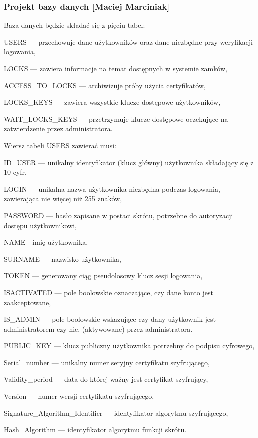 	\subsubsection{Projekt bazy danych [Maciej Marciniak]} 
	Baza danych będzie składać się z pięciu tabel:
	\begin{itemize*}
		\item {USERS} --- przechowuje dane użytkowników oraz dane niezbędne przy weryfikacji logowania,
		\item {LOCKS} --- zawiera informacje na temat dostępnych w systemie zamków,
		\item {ACCESS\_TO\_LOCKS} --- archiwizuje próby użycia certyfikatów,
		\item {LOCKS\_KEYS} --- zawiera wszystkie klucze dostępowe użytkowników,
		\item {WAIT\_LOCKS\_KEYS} --- przetrzymuje klucze dostępowe oczekujące na zatwierdzenie przez administratora.
	\end{itemize*}
	
	Wiersz tabeli USERS zawierać musi:
	\begin{itemize*}
		\item {ID\_USER} --- unikalny identyfikator (klucz główny) użytkownika składający się z 10 cyfr,
		\item {LOGIN} --- unikalna nazwa użytkownika niezbędna podczas logowania, zawierająca nie więcej niż 255 znaków,
		\item {PASSWORD} --- hasło zapisane w postaci skrótu, potrzebne do autoryzacji dostępu użytkownikowi,
		\item {NAME} - imię użytkownika,
		\item {SURNAME} --- nazwisko użytkownika,
		\item {TOKEN} --- generowany ciąg pseudolosowy klucz sesji logowania,
		\item  {ISACTIVATED} --- pole boolowskie oznaczające, czy dane konto jest zaakceptowane,
		\item {IS\_ADMIN} --- pole boolowskie wskazujące czy dany użytkownik jest administratorem czy nie, (aktywowane) przez administratora.
		\item {PUBLIC\_KEY} --- klucz publiczny użytkownika potrzebny do podpisu cyfrowego,
		\item Serial\_number --- unikalny numer seryjny certyfikatu szyfrującego,
		\item Validity\_period --- data do której ważny jest certyfikat szyfrujący,
		\item Version --- numer wersji certyfikatu szyfrującego,
		\item Signature\_Algorithm\_Identifier --- identyfikator algorytmu szyfrującego,
		\item Hash\_Algorithm --- identyfikator algorytmu funkcji skrótu.
	\end{itemize*}
	
